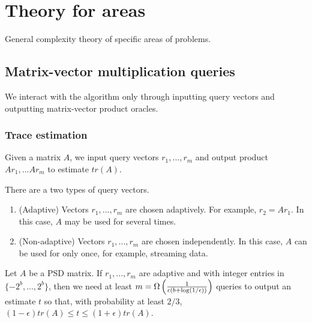 \chapter{Theory for areas}
General complexity theory of specific areas of problems. 

\section{Matrix-vector multiplication queries}
We interact with the algorithm only through inputting query vectors and outputting matrix-vector product oracles. 

\subsection{Trace estimation}
\begin{prob}
\label{tr_est}
Given a matrix $A$, we input query vectors $r_1,...,r_m$ and output product $Ar_1,...Ar_m$ to estimate $tr(A)$. 
\end{prob}


There are a two types of query vectors.
\begin{enumerate}
    \item (Adaptive) Vectors $r_1,...,r_m$ are chosen adaptively. For example, $r_2=Ar_1$. In this case, $A$ may be used for several times.
    \item (Non-adaptive) Vectors $r_1,...,r_m$ are chosen independently. In this case, $A$ can be used for only once, for example, streaming data.
\end{enumerate}

\begin{thm}
\label{tr_est_ada}
    Let $A$ be a PSD matrix. If $r_1,...,r_m$ are adaptive and with integer entries in $\{-2^b,...,2^b\}$, then we need at least $m=\Omega\left(\frac{1}{\epsilon(b+\log(1/\epsilon))}\right)$ queries to output an estimate $t$ so that, with probability at least $2/3$, $(1-\epsilon)tr(A)\le t\le (1+\epsilon)tr(A)$.
\end{thm}

